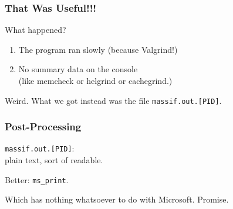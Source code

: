 \begin{frame}
\frametitle{That Was Useful!!!}

\large

What happened? 

\begin{enumerate}
\item The program ran slowly (because Valgrind!)

\item No summary data on the console \\
\hspace*{2em} (like memcheck or helgrind or cachegrind.)
\end{enumerate}

Weird. What we got instead was the file \texttt{massif.out.[PID]}.


\end{frame}


\begin{frame}
\frametitle{Post-Processing}

\Large

\texttt{massif.out.[PID]}:\\
\hspace*{2cm} plain text, sort of readable.

Better: \texttt{ms\_print}.

Which has nothing whatsoever to do with Microsoft. Promise.


\end{frame}


